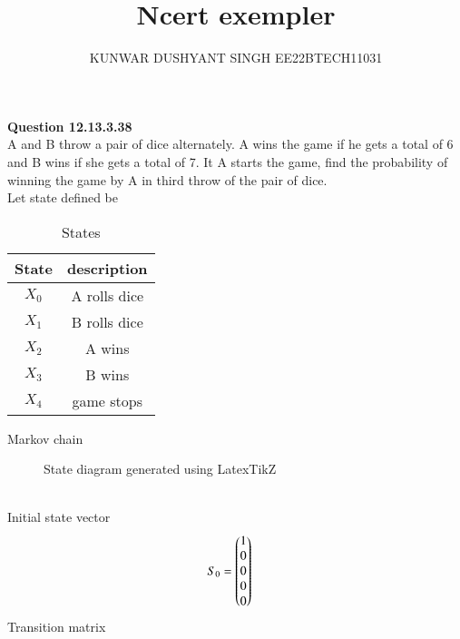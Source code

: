 \documentclass[journal,12pt,twocolumn]{IEEEtran}
\begin{document}



\vspace{3cm}

\title{
Ncert exempler
}
\author{ KUNWAR DUSHYANT SINGH EE22BTECH11031}


\maketitle

\newpage

\maketitle
\textbf{Question 12.13.3.38}\\
A and B throw a pair of dice alternately. A wins the game if he gets a total of
6 and B wins if she gets a total of 7. It A starts the game, find the probability of
winning the game by A in third throw of the pair of dice.\\
\solution
Let state defined be
\begin{table}[H]
\begin{tabular}{|c|c|}
\hline
State &description \\ \hline
 $X_0$ & A rolls dice\\ \hline
 $X_1$ & B rolls dice\\\hline
 $X_2$ & A wins\\\hline
 $X_3$ & B wins\\\hline
 $X_4$  & game stops\\\hline
\end{tabular}
\caption{States}
\label{tab:exemplar/12/13/3/38}
\end{table}
Markov chain\\
\begin{figure}[ht!]
    \centering
    \resizebox{\linewidth}{!}{}
    \caption{State diagram generated using LatexTikZ}
    \label{fig:Statediagramdiecoin}
\end{figure}
\\
Initial state vector\\
\begin{align}
S_0 &= \begin{pmatrix} 1\\ 0\\0\\0\\0\\\end{pmatrix}
\end{align}
Transition matrix\\
\end{document}
